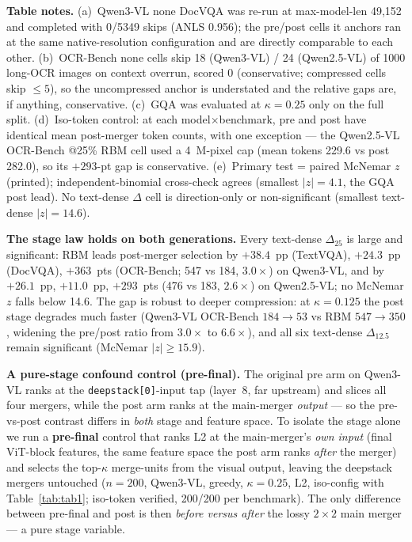 \documentclass[sigconf,review,anonymous]{acmart}
\begin{document}
\begin{table}[t]
  \vspace{3pt}
  \footnotesize
  \textbf{Table notes.} (a)~Qwen3-VL none DocVQA was re-run at max-model-len
  49,152 and completed with 0/5349 skips (ANLS 0.956); the pre/post cells it
  anchors ran at the same native-resolution configuration and are directly
  comparable to each other. (b)~OCR-Bench none cells skip 18 (Qwen3-VL) / 24
  (Qwen2.5-VL) of 1000 long-OCR images on context overrun, scored 0
  (conservative; compressed cells skip $\leq 5$), so the uncompressed anchor is
  understated and the relative gaps are, if anything, conservative. (c)~GQA was
  evaluated at $\kappa = 0.25$ only on the full split. (d)~Iso-token control: at
  each model$\times$benchmark, pre and post have identical mean post-merger
  token counts, with one exception --- the Qwen2.5-VL OCR-Bench @25\% RBM cell
  used a 4~M-pixel cap (mean tokens 229.6 vs post 282.0), so its $+293$-pt gap
  is conservative. (e)~Primary test = paired McNemar $z$ (printed);
  independent-binomial cross-check agrees (smallest $|z| = 4.1$, the GQA post
  lead). No text-dense $\Delta$ cell is direction-only or non-significant
  (smallest text-dense $|z| = 14.6$).
\end{table}

\textbf{The stage law holds on both generations.} Every text-dense
$\Delta_{25}$ is large and significant: RBM leads post-merger selection by
$+38.4$~pp (TextVQA), $+24.3$~pp (DocVQA), $+363$~pts (OCR-Bench; 547 vs 184,
$3.0\times$) on Qwen3-VL, and by $+26.1$~pp, $+11.0$~pp, $+293$~pts (476 vs 183,
$2.6\times$) on Qwen2.5-VL; no McNemar $z$ falls below 14.6. The gap is robust to
deeper compression: at $\kappa = 0.125$ the post stage degrades much faster
(Qwen3-VL OCR-Bench $184 \to 53$ vs RBM $547 \to 350$, widening the pre/post
ratio from $3.0\times$ to $6.6\times$), and all six text-dense $\Delta_{12.5}$
remain significant (McNemar $|z| \geq 15.9$).

\textbf{A pure-stage confound control (pre-final).} The original pre arm on
Qwen3-VL ranks at the \texttt{deepstack[0]}-input tap (layer~8, far upstream)
and slices all four mergers, while the post arm ranks at the main-merger
\emph{output} --- so the pre-vs-post contrast differs in \emph{both} stage and
feature space. To isolate the stage alone we run a \textbf{pre-final} control
that ranks L2 at the main-merger's \emph{own input} (final ViT-block features,
the same feature space the post arm ranks \emph{after} the merger) and selects
the top-$\kappa$ merge-units from the visual output, leaving the deepstack
mergers untouched ($n = 200$, Qwen3-VL, greedy, $\kappa = 0.25$, L2, iso-config
with Table~\ref{tab:tab1}; iso-token verified, 200/200 per benchmark). The only
difference between pre-final and post is then \emph{before versus after} the
lossy $2\!\times\!2$ main merger --- a pure stage variable.
\end{document}

